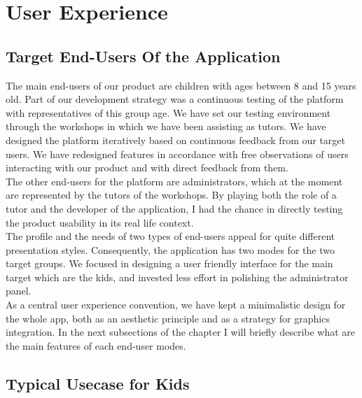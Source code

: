 
\chapter{User Experience}


\section{Target End-Users Of the Application}

The main end-users of our product are children with ages between 8 and 15 years old. Part of our development strategy was a continuous testing of the platform with representatives of this group age. We have set our testing environment through the workshops in which we have been assisting as tutors. 
We have designed the platform iteratively based on continuous feedback from our target users. We have redesigned features in accordance with free observations of users interacting with our product and with direct feedback from them. \\

The other  end-users for the platform are administrators, which at the moment are represented by the tutors of the workshops. By playing both the role of a tutor and the developer of the application, I had the chance in directly testing the product usability in its real life context.\\

The profile and the needs of two types of end-users appeal for quite different presentation styles. Consequently, the application has two modes for the two target groups. We focused in designing a user friendly interface for the main target which are the kids, and invested less effort in polishing the administrator panel.	\\

As a central user experience convention, we have kept a minimalistic design for the whole app, both as an aesthetic principle and as a strategy for  graphics integration.	
In the next subsections of the chapter I will briefly describe what are the main features of each end-user modes.


\newpage
\section{Typical Usecase for Kids}


